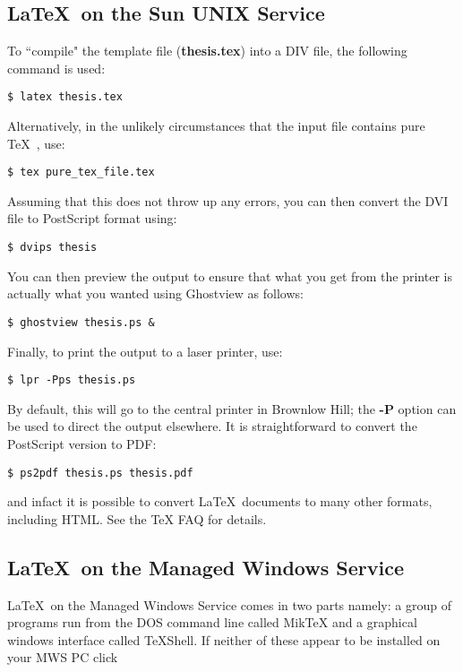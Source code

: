 \documentclass[11pt,oneside]{book}
\begin{document}
\subsection{\LaTeX \ on the Sun UNIX Service}

To ``compile" the template file ({\bf thesis.tex}) into a DIV file, the
following command is used:

\begin{verbatim}
$ latex thesis.tex
\end{verbatim}

Alternatively, in the unlikely circumstances that the input file contains pure
\TeX \ , use:

\begin{verbatim}
$ tex pure_tex_file.tex
\end{verbatim}

Assuming that this does not throw up any errors, you can then convert the
DVI file to PostScript format using:

\begin{verbatim}
$ dvips thesis
\end{verbatim}

You can then preview the output to ensure that what you get from the
printer is actually what you wanted using Ghostview as
follows:

\begin{verbatim}
$ ghostview thesis.ps &
\end{verbatim}


Finally, to print the output to a laser printer, use:

\begin{verbatim}
$ lpr -Pps thesis.ps
\end{verbatim}


By default, this will go to the central printer in Brownlow Hill;
the {\bf -P} option can be used to direct the output elsewhere. It is
straightforward to convert the PostScript version to PDF:

\begin{verbatim}
$ ps2pdf thesis.ps thesis.pdf
\end{verbatim}

and infact it is possible to convert \LaTeX \ documents to many other formats, including
HTML. See the TeX FAQ for details.


\subsection{\LaTeX \ on the Managed Windows Service}
\LaTeX \ on the Managed Windows Service comes in two parts namely:
a group of programs run from the DOS command line called MikTeX
and a graphical windows interface called TeXShell. If neither
of these appear to be installed on your MWS PC click
\end{document}
